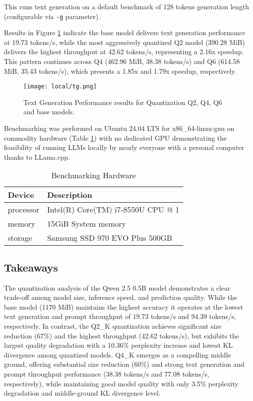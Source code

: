 This runs text generation on a default benchmark of 128 tokens generation length (configurable via \texttt{-g} parameter).

Results in Figure \ref{fig:tg} indicate the base model delivers text generation performance at 19.73 tokens/s, while the most aggressively quantized Q2 model (390.28 MiB) delivers the highest throughput at 42.62 tokens/s, representing a 2.16x speedup. This pattern continues across Q4 (462.96 MiB, 38.38 tokens/s) and Q6 (614.58 MiB, 35.43 tokens/s), which presents a 1.85x and 1.79x speedup, respectively.

\begin{figure}[H]
\centering
\texttt{[image: local/tg.png]}
\caption{Text Generation Performance results for Quantization Q2, Q4, Q6 and base models.}
\label{fig:tg}
\end{figure}

Benchmarking was performed on Ubuntu 24.04 LTS for x86\_64-linux-gnu on commodity hardware (Table \ref{tab:benchmarking-hardware}) with no dedicated GPU demonstrating the feasibility of running LLMs locally by nearly everyone with a personal computer thanks to LLama.cpp.

\begin{table}[H]
\centering
\caption{Benchmarking Hardware}
\label{tab:benchmarking-hardware}
\begin{tabular}{ll}
\toprule
Device & Description \\
\midrule
processor & Intel(R) Core(TM) i7-8550U CPU @ 1 \\
memory & 15GiB System memory \\
storage & Samsung SSD 970 EVO Plus 500GB \\
\bottomrule
\end{tabular}
\end{table}


\subsection{Takeaways}

The quantization analysis of the Qwen 2.5 0.5B model demonstrates a clear trade-off among model size, inference speed, and prediction quality. While the base model (1170 MiB) maintains the highest accuracy it operates at the lowest text generation and prompt throughput of 19.73 tokens/s and 94.39 tokens/s, respectively. In contrast, the Q2\_K quantization achieves significant size reduction (67\%) and the highest throughput (42.62 tokens/s), but exhibits the largest quality degradation with a 10.36\% perplexity increase and lowest KL divergence among quantized models. Q4\_K emerges as a compelling middle ground, offering substantial size reduction (60\%) and strong text generation and prompt throughput performance (38.38 tokens/s and 77.08 tokens/s, respectively), while maintaining good model quality with only 3.5\% perplexity degradation and middle-ground KL divergence level. 


